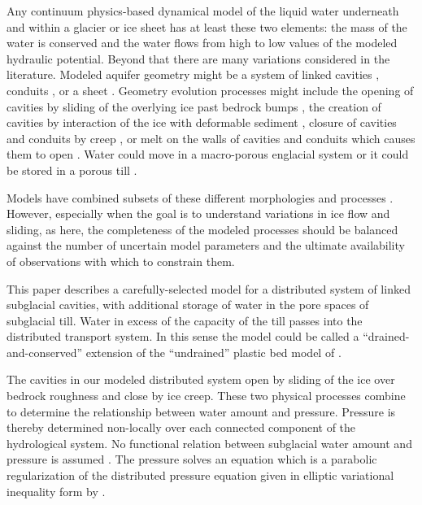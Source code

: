 \documentclass[gmd]{copernicus}   %
\begin{document}
\introduction

Any continuum physics-based dynamical model of the liquid water underneath and within a glacier or ice sheet has at least these two elements: the mass of the water is conserved and the water flows from high to low values of the modeled hydraulic potential.  Beyond that there are many variations considered in the literature.  Modeled aquifer geometry might be a system of linked cavities \citep{Kamb1987}, conduits \citep{Nye1976}, or a sheet \citep{CreytsSchoof2009}.  Geometry evolution processes might include the opening of cavities by sliding of the overlying ice past bedrock bumps \citep{Schoof2005cavitation}, the creation of cavities by interaction of the ice with deformable sediment \citep{Schoof2007deformable}, closure of cavities and conduits by creep \citep{Hewitt2011}, or melt on the walls of cavities and conduits which causes them to open \citep{Clarke05}.  Water could move in a macro-porous englacial system \citep{Bartholomausetal2011} or it could be stored in a porous till \citep{Tulaczyketal2000}.

Models have combined subsets of these different morphologies and processes \citep{FlowersClarke2002_theory,Hewitt2013,HoffmanPrice2014,vanderWeletal2013,Werderetal2013,deFleurianetal2014}.  However, especially when the goal is to understand variations in ice flow and sliding, as here, the completeness of the modeled processes should be balanced against the number of uncertain model parameters and the ultimate availability of observations with which to constrain them.

This paper describes a carefully-selected model for a distributed system of linked subglacial cavities, with additional storage of water in the pore spaces of subglacial till.  Water in excess of the capacity of the till passes into the distributed transport system.  In this sense the model could be called a ``drained-and-conserved'' extension of the ``undrained'' plastic bed model of \cite{Tulaczyketal2000b}.

The cavities in our modeled distributed system open by sliding of the ice over bedrock roughness and close by ice creep.  These two physical processes combine to determine the relationship between water amount and pressure.  Pressure is thereby determined non-locally over each connected component of the hydrological system.  No functional relation between subglacial water amount and pressure is assumed \citep[compare][]{FlowersClarke2002_theory}.  The pressure solves an equation which is a parabolic regularization of the distributed pressure equation given in elliptic variational inequality form by \cite{Schoofetal2012}.
\end{document}
